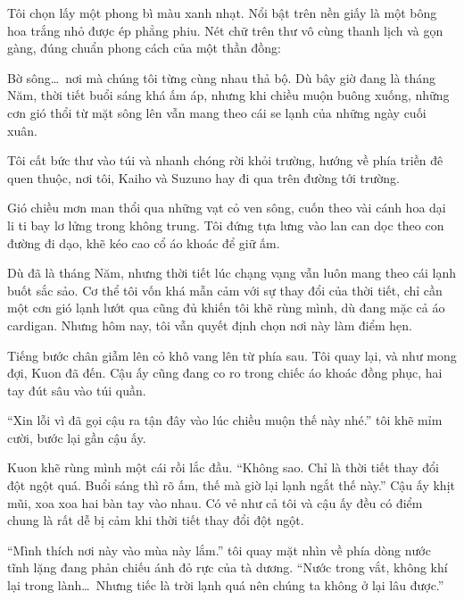 \documentclass[../main.tex]{subfiles}
\begin{document}
Tôi chọn lấy một phong bì màu xanh nhạt. Nổi bật trên nền giấy là một bông hoa trắng nhỏ được ép phẳng phiu. Nét chữ trên thư vô cùng thanh lịch và gọn gàng, đúng chuẩn phong cách của một thần đồng:


Bờ sông\dots\ nơi mà chúng tôi từng cùng nhau thả bộ. Dù bây giờ đang là tháng Năm, thời tiết buổi sáng khá ấm áp, nhưng khi chiều muộn buông xuống, những cơn gió thổi từ mặt sông lên vẫn mang theo cái se lạnh của những ngày cuối xuân.

Tôi cất bức thư vào túi và nhanh chóng rời khỏi trường, hướng về phía triền đê quen thuộc, nơi tôi, Kaiho và Suzuno hay đi qua trên đường tới trường.

\ct


Gió chiều mơn man thổi qua những vạt cỏ ven sông, cuốn theo vài cánh hoa dại li ti bay lơ lửng trong không trung. Tôi đứng tựa lưng vào lan can dọc theo con đường đi dạo, khẽ kéo cao cổ áo khoác để giữ ấm.

Dù đã là tháng Năm, nhưng thời tiết lúc chạng vạng vẫn luôn mang theo cái lạnh buốt sắc sảo. Cơ thể tôi vốn khá mẫn cảm với sự thay đổi của thời tiết, chỉ cần một cơn gió lạnh lướt qua cũng đủ khiến tôi khẽ rùng mình, dù đang mặc cả áo cardigan. Nhưng hôm nay, tôi vẫn quyết định chọn nơi này làm điểm hẹn.

Tiếng bước chân giẫm lên cỏ khô vang lên từ phía sau. Tôi quay lại, và như mong đợi, Kuon đã đến. Cậu ấy cũng đang co ro trong chiếc áo khoác đồng phục, hai tay đút sâu vào túi quần.

``Xin lỗi vì đã gọi cậu ra tận đây vào lúc chiều muộn thế này nhé.'' tôi khẽ mỉm cười, bước lại gần cậu ấy.

Kuon khẽ rùng mình một cái rồi lắc đầu. ``Không sao. Chỉ là thời tiết thay đổi đột ngột quá. Buổi sáng thì rõ ấm, thế mà giờ lại lạnh ngắt thế này.'' Cậu ấy khịt mũi, xoa xoa hai bàn tay vào nhau. Có vẻ như cả tôi và cậu ấy đều có điểm chung là rất dễ bị cảm khi thời tiết thay đổi đột ngột.

``Mình thích nơi này vào mùa này lắm.'' tôi quay mặt nhìn về phía dòng nước tĩnh lặng đang phản chiếu ánh đỏ rực của tà dương. ``Nước trong vắt, không khí lại trong lành\dots\ Nhưng tiếc là trời lạnh quá nên chúng ta không ở lại lâu được.''
\end{document}
